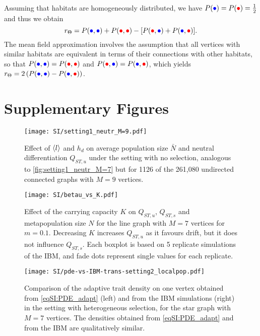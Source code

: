 Assuming that habitats are homogeneously distributed, we have $P(\bcirc) = P(\rcirc) = \frac{1}{2}$ and thus we obtain
\begin{equation}\label{eqSI:r_theta_homo}
  r_\Theta =   P(\bcirc,\bcirc) + P(\rcirc,\rcirc)   -  [ P(\rcirc,\bcirc) + P(\bcirc,\rcirc)].
\end{equation}
%
The mean field approximation involves the assumption that all vertices with similar habitats are equivalent in terms of their connections with other habitats, so that $P(\bcirc,\bcirc) = P(\rcirc,\rcirc)$ and $P(\rcirc,\bcirc) = P(\bcirc,\rcirc)$, which yields $r_\Theta = 2 \left( P({\bcirc},{\bcirc}) - P({\bcirc},{\rcirc}) \right)$.


\clearpage


\section{Supplementary Figures}

\begin{figure}[t]
  \centerline{
      \texttt{[image: SI/setting1\_neutr\_M=9.pdf]} 
  }
  \caption{Effect of $\langle l \rangle$ and $h_d$ on average population size $\bar{N}$ and neutral differentiation $Q_{ST,u}$ under the setting with no selection, analogous to \cref{fig:setting1_neutr_M=7} but for 1126 of the 261,080 undirected connected graphs with $M=9$ vertices.}
  \label{figSI:setting1_neutr_M=9}
\end{figure}
\FloatBarrier


\begin{figure}[t]
  \centering
    \texttt{[image: SI/betau\_vs\_K.pdf]}
    \caption{Effect of the carrying capacity $K$ on $Q_{ST,u}$, $Q_{ST,s}$ and metapopulation size $N$ for the line graph with $M=7$ vertices for $m=0.1$. Decreasing $K$ increases $Q_{ST,u}$ as it favours drift, but it does not influence $Q_{ST,s}$. Each boxplot is based on 5 replicate simulations of the IBM, and fade dots represent single values for each replicate.}\label{figSI:betau_vs_K}
\end{figure}

\FloatBarrier

\begin{figure}[t]
  \centerline{
      \texttt{[image: SI/pde-vs-IBM-trans-setting2\_localpop.pdf]}}
    \caption{ Comparison of the adaptive trait density on one vertex obtained from \cref{eqSI:PDE_adapt} (left) and from the IBM simulations (right) in the setting with heterogeneous selection, for the star graph with $M=7$ vertices. The densities obtained from \cref{eqSI:PDE_adapt} and from the IBM are qualitatively similar.}
    \label{figSI:pde-vs-IBM-trans-setting2_localpop}
\end{figure}
\FloatBarrier

